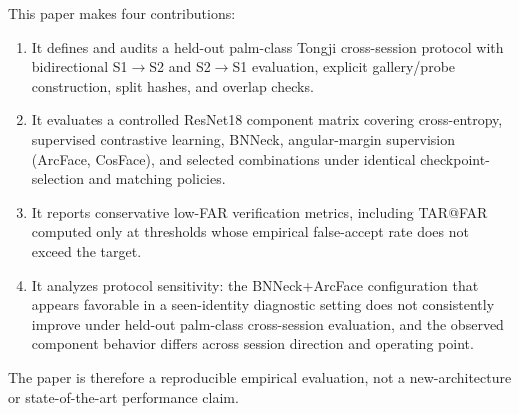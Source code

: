 This paper makes four contributions:
\begin{enumerate}
    \item It defines and audits a held-out palm-class Tongji cross-session protocol with bidirectional S1$\rightarrow$S2 and S2$\rightarrow$S1 evaluation, explicit gallery/probe construction, split hashes, and overlap checks.
    \item It evaluates a controlled ResNet18 component matrix covering cross-entropy, supervised contrastive learning, BNNeck, angular-margin supervision (ArcFace, CosFace), and selected combinations under identical checkpoint-selection and matching policies.
    \item It reports conservative low-FAR verification metrics, including TAR@FAR computed only at thresholds whose empirical false-accept rate does not exceed the target.
    \item It analyzes protocol sensitivity: the BNNeck+ArcFace configuration that appears favorable in a seen-identity diagnostic setting does not consistently improve under held-out palm-class cross-session evaluation, and the observed component behavior differs across session direction and operating point.
\end{enumerate}
The paper is therefore a reproducible empirical evaluation, not a new-architecture or state-of-the-art performance claim.
